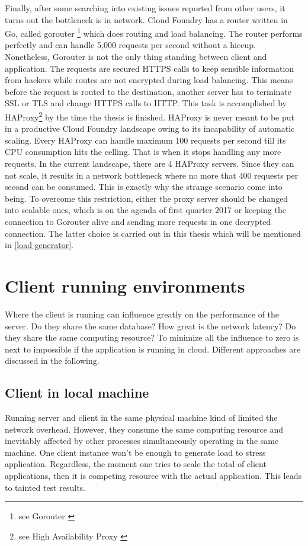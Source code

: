 Finally, after some searching into existing issues reported from other users, it turns out the bottleneck is in network. Cloud Foundry has a router written in Go, called gorouter \footnote{ see Gorouter \citep{Gorouter}} which does routing and load balancing. The router performs perfectly and can handle 5,000 requests per second without a hiccup. Nonetheless, Gorouter is not the only thing standing between client and application. The requests are secured HTTPS calls to keep sensible information from hackers while routes are not encrypted during load balancing. This means before the request is routed to the destination, another server has to terminate SSL or TLS and change HTTPS calls to HTTP. This task is accomplished by HAProxy\footnote{see High Availability Proxy \citep{HAProxy}} by the time the thesis is finished. HAProxy is never meant to be put in a productive Cloud Foundry landscape owing to its incapability of automatic scaling. Every HAProxy can handle maximum 100 requests per second till its CPU consumption hits the celling. That is when it stops handling any more requests. In the current landscape, there are 4 HAProxy servers. Since they can not scale, it results in a network bottleneck where no more that 400 requests per second can be consumed. This is exactly why the strange scenario come into being. To overcome this restriction, either the proxy server should be changed into scalable ones, which is on the agenda of first quarter 2017 or keeping the connection to Gorouter alive and sending more requests in one decrypted connection. The latter choice is carried out in this thesis which will be mentioned in \ref{load generator}.


\section{ Client running environments}
Where the client is running can influence greatly on the performance of the server. Do they share the same database? How great is the network latency? Do they share the same computing resource? To minimize all the influence to zero is next to impossible if the application is running in cloud. Different approaches are discussed in the following. 

\subsection{Client in local machine}
Running server and client in the same physical machine kind of limited the network overhead. However, they consume the same computing resource and inevitably affected by other processes simultaneously operating in the same machine. One client instance won't be enough to generate load to stress application. Regardless, the moment one tries to scale the total of client applications, then it is competing resource with the actual application. This leads to tainted test results.  
